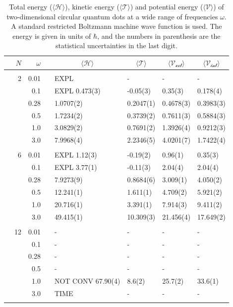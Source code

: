 \begin{table}
	\caption{Total energy ($\langle\mathcal{H}\rangle$), kinetic energy ($\langle\mathcal{T}\rangle$) and potential energy ($\langle\mathcal{V}\rangle$) of two-dimensional circular quantum dots at a wide range of frequencies $\omega$. A standard restricted Boltzmann machine wave function is used. The energy is given in units of $\hbar$, and the numbers in parenthesis are the statistical uncertainties in the last digit.}
	\label{tab:splitfrequencyQDRBM}
	\begin{tabularx}{\textwidth}{R{1.5cm}rrcR{2.3cm}R{2.3cm}R{2.3cm}R{2.3cm}} \hline\hline
		& & $\omega$ &&  &  &  &  \\ \hline \\
		&2 & 0.01 && EXPL & - & - & - \\
		&& 0.1 && EXPL 0.473(3) & -0.05(3) & 0.35(3) & 0.178(4) \\
		&& 0.28 && 1.0707(2) & 0.2047(1) & 0.4678(3) & 0.3983(3) \\
		&& 0.5 && 1.7234(2) & 0.3739(2) & 0.7611(3) & 0.5884(3)\\
		&& 1.0 && 3.0829(2) & 0.7691(2) & 1.3926(4) & 0.9212(3)\\
		&& 3.0 && 7.9968(4) & 2.2346(5) & 4.0201(7) & 1.7422(4) \\ \hdashline \\
		
		&6 & 0.01 && EXPL 1.12(3) & -0.19(2) & 0.96(1) & 0.35(3) \\
		&& 0.1 && EXPL 3.77(1) & -0.11(3) & 2.04(4) & 2.04(4) \\
		&& 0.28 && 7.9273(9) & 0.8684(6) & 3.009(1) & 4.050(2) \\
		&& 0.5 && 12.241(1) & 1.611(1) & 4.709(2) & 5.921(2)\\
		&& 1.0 && 20.716(1) & 3.391(1) & 7.914(3) & 9.411(2)\\
		&& 3.0 && 49.415(1) & 10.309(3) & 21.456(4) & 17.649(2) \\ \hdashline \\
		
		&12 & 0.01 && - & - & - & - \\
		&& 0.1 && - & - & - & - \\
		&& 0.28 && - & - & - & - \\
		&& 0.5 && - & - & - & - \\
		&& 1.0 && NOT CONV 67.90(4) & 8.6(2) & 25.7(2) & 33.6(1) \\
		&& 3.0 && TIME & - & - & - \\ \hdashline \\
		

\end{tabularx}
\end{table}
